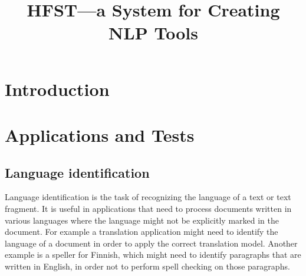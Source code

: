 \documentclass{llncs}
\begin{document}
%
\title{HFST---a System for Creating NLP Tools}
%
\iffalse
\author{Krister Lind\'{e}n \and Erik Axelson \and Senka Drobac \and Sam Hardwick \and\\
Juha Kuokkala \and Jyrki Niemi \and Tommi A Pirinen \and Miikka Silfverberg}


\institute{University of Helsinki\\
Department of Modern Languages\\
Unioninkatu 40 A\\
FI-00014 Helsingin yliopisto, Finland\\
\email{\{krister.linden, erik.axelson, senka.drobac, sam.hardwick,\\
juha.kuokkala, jyrki.niemi, tommi.pirinen, miikka.silfverberg\}@helsinki.fi}}
\fi

\maketitle


\begin{abstract}
\end{abstract}


\section*{Introduction}

\section{Applications and Tests}\label{hfst:structural-layout}

\subsection{Language identification}
Language identification is the task of recognizing the language of a
text or text fragment. It is useful in applications that need to
process documents written in various languages where the language
might not be explicitly marked in the document. For example a translation
application might need to identify the language of a document in order
to apply the correct translation model. Another example is a speller
for Finnish, which might need to identify paragraphs that are written in
English, in order not to perform spell checking on those paragraphs.
\end{document}
